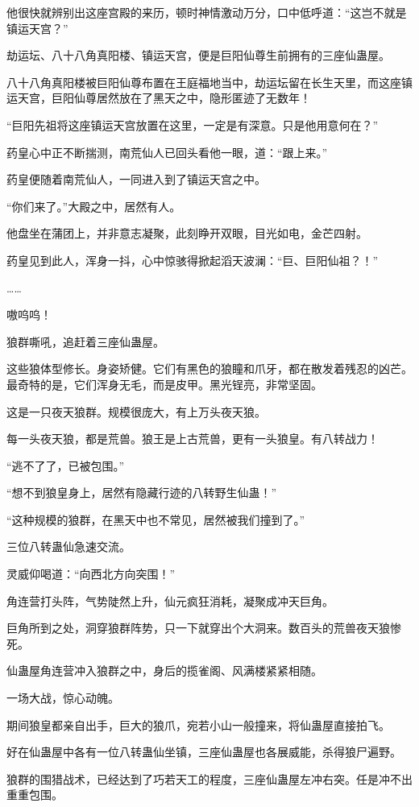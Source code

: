 \begin{this_body}
他很快就辨别出这座宫殿的来历，顿时神情激动万分，口中低呼道：“这岂不就是镇运天宫？”

劫运坛、八十八角真阳楼、镇运天宫，便是巨阳仙尊生前拥有的三座仙蛊屋。

八十八角真阳楼被巨阳仙尊布置在王庭福地当中，劫运坛留在长生天里，而这座镇运天宫，巨阳仙尊居然放在了黑天之中，隐形匿迹了无数年！

“巨阳先祖将这座镇运天宫放置在这里，一定是有深意。只是他用意何在？”

药皇心中正不断揣测，南荒仙人已回头看他一眼，道：“跟上来。”

药皇便随着南荒仙人，一同进入到了镇运天宫之中。

“你们来了。”大殿之中，居然有人。

他盘坐在蒲团上，并非意志凝聚，此刻睁开双眼，目光如电，金芒四射。

药皇见到此人，浑身一抖，心中惊骇得掀起滔天波澜：“巨、巨阳仙祖？！”

……

嗷呜呜！

狼群嘶吼，追赶着三座仙蛊屋。

这些狼体型修长。身姿矫健。它们有黑色的狼瞳和爪牙，都在散发着残忍的凶芒。最奇特的是，它们浑身无毛，而是皮甲。黑光锃亮，非常坚固。

这是一只夜天狼群。规模很庞大，有上万头夜天狼。

每一头夜天狼，都是荒兽。狼王是上古荒兽，更有一头狼皇。有八转战力！

“逃不了了，已被包围。”

“想不到狼皇身上，居然有隐藏行迹的八转野生仙蛊！”

“这种规模的狼群，在黑天中也不常见，居然被我们撞到了。”

三位八转蛊仙急速交流。

灵威仰喝道：“向西北方向突围！”

角连营打头阵，气势陡然上升，仙元疯狂消耗，凝聚成冲天巨角。

巨角所到之处，洞穿狼群阵势，只一下就穿出个大洞来。数百头的荒兽夜天狼惨死。

仙蛊屋角连营冲入狼群之中，身后的揽雀阁、风满楼紧紧相随。

一场大战，惊心动魄。

期间狼皇都亲自出手，巨大的狼爪，宛若小山一般撞来，将仙蛊屋直接拍飞。

好在仙蛊屋中各有一位八转蛊仙坐镇，三座仙蛊屋也各展威能，杀得狼尸遍野。

狼群的围猎战术，已经达到了巧若天工的程度，三座仙蛊屋左冲右突。任是冲不出重重包围。


\end{this_body}
